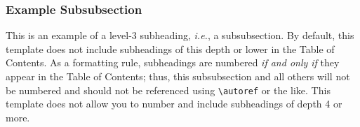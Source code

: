 \subsubsection{Example Subsubsection}
This is an example of a level-3 subheading, \textit{i.e.}, a subsubsection.
By default, this template does not include subheadings of this depth or lower in the Table of Contents.
As a formatting rule, subheadings are numbered \textit{if and only if} they appear in the Table of Contents; thus, this subsubsection and all others will not be numbered and should not be referenced using \verb|\autoref| or the like.
This template does not allow you to number and include subheadings of depth 4 or more.
